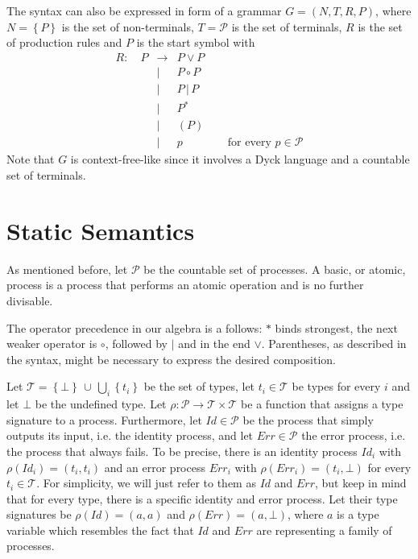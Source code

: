 The syntax can also be expressed in form of a grammar $G = \left( N, T, R, P \right)$, where $N = \left\{ P \right\}$ is the set of non-terminals, $T = \mathcal{P}$ is the set of terminals, $R$ is the set of production rules and $P$ is the start symbol \cite{Hopcroft:2006:IAT:1196416} with %
\begin{eqnarray*}
  R \colon \quad P & \to & P \vee P \\
    & | & P \circ P \\
    & | & P \,|\, P \\
    & | & P^* \\
    & | & \left( P \right) \\
    & | & p \quad\quad\quad\quad \text{for every } p \in \mathcal{P}
\end{eqnarray*}
Note that $G$ is context-free-like since it involves a Dyck language \cite{} and a countable set of terminals.

\section{Static Semantics}
\label{chp:static_semantics}
As mentioned before, let $\mathcal{P}$ be the countable set of processes. A basic, or atomic, process is a process that performs an atomic operation and is no further divisable.

The operator precedence in our algebra is a follows: $*$ binds strongest, the next weaker operator is $\circ$, followed by $|$ and in the end $\vee$. Parentheses, as described in the syntax, might be necessary to express the desired composition.

Let $\mathcal{T} = \left\{ \bot \right\} \, \cup \, \bigcup_i \left\{ t_i \right\}$ be the set of types, let $t_i \in \mathcal{T}$ be types for every $i$ and let $\bot$ be the undefined type. Let $\rho \colon \mathcal{P} \to \mathcal{T} \times \mathcal{T}$ be a function that assigns a type signature to a process. Furthermore, let $Id \in \mathcal{P}$ be the process that simply outputs its input, i.e. the identity process, and let $Err \in \mathcal{P}$ the error process, i.e. the process that always fails. To be precise, there is an identity process $Id_i$ with $\rho \left( Id_i \right) = \left( t_i, t_i \right)$ and an error process $Err_i$ with $\rho \left( Err_i \right) = \left( t_i, \bot \right)$ for every $t_i \in \mathcal{T}$. For simplicity, we will just refer to them as $Id$ and $Err$, but keep in mind that for every type, there is a specific identity and error process. Let their type signatures be $\rho \left( Id \right) = \left( a, a \right)$ and $\rho \left( Err \right) = \left( a, \bot \right)$, where $a$ is a type variable which resembles the fact that $Id$ and $Err$ are representing a family of processes.

